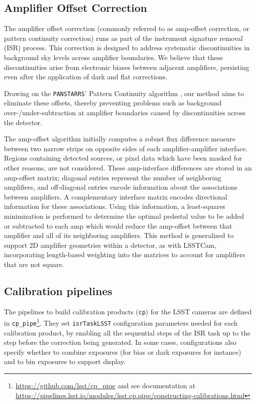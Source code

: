 \subsection{Amplifier Offset Correction}
\label{sec:isr:ampoffset}
The amplifier offset correction (commonly referred to as amp-offset correction, or pattern continuity correction) runs as part of the instrument signature removal (ISR) process.
This correction is designed to address systematic discontinuities in background sky levels across amplifier boundaries.
We believe that these discontinuities arise from electronic biases between adjacent amplifiers, persisting even after the application of dark and flat corrections.

Drawing on the \texttt{PANSTARRS}' Pattern Continuity algorithm \citep{2020ApJS..251....4W}, our method aims to eliminate these offsets, thereby preventing problems such as background over-/under-subtraction at amplifier boundaries caused by discontinuities across the detector.

The amp-offset algorithm initially computes a robust flux difference measure between two narrow strips on opposite sides of each amplifier-amplifier interface.
Regions containing detected sources, or pixel data which have been masked for other reasons, are not considered.
These amp-interface differences are stored in an amp-offset matrix; diagonal entries represent the number of neighboring amplifiers, and off-diagonal entries encode information about the associations between amplifiers.
A complementary interface matrix encodes directional information for these associations.
Using this information, a least-squares minimization is performed to determine the optimal pedestal value to be added or subtracted to each amp which would reduce the amp-offset between that amplifier and all of its neighboring amplifiers.
This method is generalized to support 2D amplifier geometries within a detector, as with LSSTCam, incorporating length-based weighting into the matrices to account for amplifiers that are not square.

\subsection{Calibration pipelines}
\label{sec:calib_pipe}

The pipelines to build calibration products (\texttt{cp}) for the LSST cameras are defined in \texttt{cp\_pipe}\footnote{\url{https://github.com/lsst/cp\_pipe} and see documentation at \url{https://pipelines.lsst.io/modules/lsst.cp.pipe/constructing-calibrations.html}}.
They set \texttt{isrTaskLSST} configuration parameters needed for each calibration product, by enabling all the sequential steps of the ISR task up to the step before the correction being generated. In some cases, configurations also specify whether to combine exposures (for bias or dark exposures for instance) and to bin exposures to support display.


